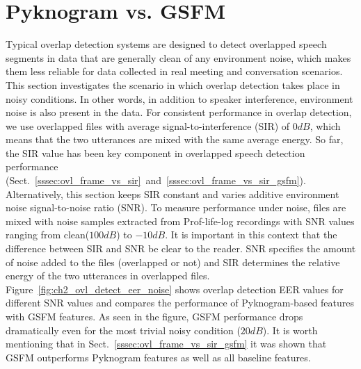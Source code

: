 {\newpage
\section{Pyknogram vs. GSFM}
\label{sec:ch2_Pykno_vs_GSFM}
Typical overlap detection systems are designed to detect overlapped speech segments in data that are generally clean of any environment noise, which makes them less reliable for data collected in real meeting and conversation scenarios. 
This section investigates the scenario in which overlap detection takes place in noisy conditions. 
In other words, in addition to speaker interference, environment noise is also present in the data. 
For consistent performance in overlap detection, we use overlapped files with average signal-to-interference (SIR) of $0dB$, which means that the two utterances are mixed with the same average energy. 
So far, the SIR value has been key component in overlapped speech detection performance (Sect.~\ref{sssec:ovl_frame_vs_sir}~and~\ref{sssec:ovl_frame_vs_sir_gsfm}).
Alternatively, this section keeps SIR constant and varies additive environment noise signal-to-noise ratio (SNR).
To measure performance under noise, files are mixed with noise samples extracted from Prof-life-log\cite{ziaei2013prof} recordings with SNR values ranging from clean($100dB$) to $-10dB$. 
It is important in this context that the difference between SIR and SNR be clear to the reader. 
SNR specifies the amount of noise added to the files (overlapped or not) and SIR determines the relative energy of the two utterances in overlapped files. 
Figure~\ref{fig:ch2_ovl_detect_eer_noise} shows overlap detection EER values for different SNR values and compares the performance of Pyknogram-based features with GSFM features. 
As seen in the figure, GSFM performance drops dramatically even for the most trivial noisy condition ($20dB$). 
It is worth mentioning that in Sect.~\ref{sssec:ovl_frame_vs_sir_gsfm} it was shown that GSFM outperforms Pyknogram features as well as all baseline features. 

}
